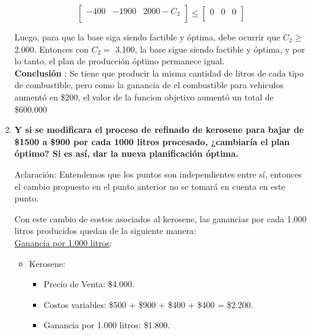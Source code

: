 \documentclass[10pt,a4paper]{article}
\begin{document}
\begin{enumerate}[label=\textbf{\sffamily\large\arabic*.}]
    
    \[
        \begin{bmatrix}
            -400           &    -1900	         &    2000 - C_2           \\
        \end{bmatrix}  
        \leq \begin{bmatrix}
            0           &    0	         &    0          \\
        \end{bmatrix} 
    \]

    Luego, para que la base siga siendo factible y óptima, debe ocurrir que $C_2 \geq$ 2.000. 
    Entonces con $C_2 = $ 3.100, la base sigue siendo factible y óptima, y por lo tanto, el plan de producción óptimo permanece igual.\\

    \textbf{Conclusión }:
    \vspace{0,5em}
    Se tiene que producir la misma cantidad de litros de cada tipo de combustible, pero como la ganancia de el combustible para vehiculos aumentó en \$200, el valor de la funcion objetivo aumentó un total de \$600.000 \\
    

    
    

    \item {\bfseries\large Y si se modificara el proceso de refinado de kerosene para bajar de \$1500 a \$900 por cada 1000 litros procesado,
    ¿cambiaría el plan óptimo? Si es así, dar la nueva planificación óptima.}
    \vspace{1em}

    Aclaración: Entendemos que los puntos son independientes entre sí, entonces el cambio propuesto en el punto anterior no se tomará en cuenta en este punto.

    \vspace{1em}


     Con este cambio de costos asociados al kerosene, las ganancias por cada 1.000 litros producidos quedan de la siguiente manera:\\

    \underline{Ganancia por 1.000 litros}:
    \begin{itemize}
    \item Kerosene:
        \begin{itemize}

            \item Precio de Venta: \$4.000.
            \item Costos variables: \$500 + \$900 + \$400 + \$400 = \$2.200.
            \item Ganancia por 1.000 litros: \$1.800. \\
    

\end{itemize}
\end{itemize}
\end{enumerate}
\end{document}
